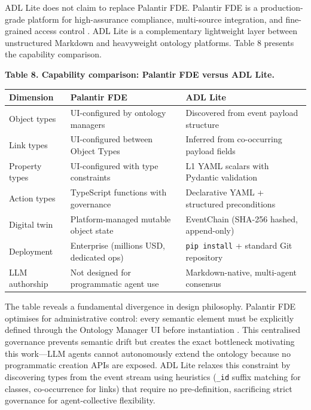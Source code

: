 ADL Lite does not claim to replace Palantir FDE. Palantir FDE is a production-grade platform for high-assurance compliance, multi-source integration, and fine-grained access control \cite{ref6}. ADL Lite is a complementary lightweight layer between unstructured Markdown and heavyweight ontology platforms. Table 8 presents the capability comparison.

\textbf{Table 8. Capability comparison: Palantir FDE versus ADL Lite.}

\begin{longtable}[]{@{}>{\raggedright\arraybackslash}p{}
  >{\raggedright\arraybackslash}p{}
  >{\raggedright\arraybackslash}p{}@{}}
\toprule
Dimension
& Palantir FDE
& ADL Lite
\\
\midrule
\endhead
\bottomrule
\endlastfoot
Object types & UI-configured by ontology managers & Discovered from event payload structure \\
Link types & UI-configured between Object Types & Inferred from co-occurring payload fields \\
Property types & UI-configured with type constraints & L1 YAML scalars with Pydantic validation \\
Action types & TypeScript functions with governance & Declarative YAML + structured preconditions \\
Digital twin & Platform-managed mutable object state & EventChain (SHA-256 hashed, append-only) \\
Deployment & Enterprise (millions USD, dedicated ops) & \texttt{pip\ install} + standard Git repository \\
LLM authorship & Not designed for programmatic agent use & Markdown-native, multi-agent consensus \\
\end{longtable}

The table reveals a fundamental divergence in design philosophy. Palantir FDE optimises for administrative control: every semantic element must be explicitly defined through the Ontology Manager UI before instantiation \cite{ref6}. This centralised governance prevents semantic drift but creates the exact bottleneck motivating this work---LLM agents cannot autonomously extend the ontology because no programmatic creation APIs are exposed. ADL Lite relaxes this constraint by discovering types from the event stream using heuristics (\texttt{\_id} suffix matching for classes, co-occurrence for links) that require no pre-definition, sacrificing strict governance for agent-collective flexibility.

